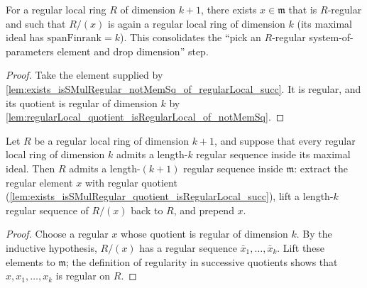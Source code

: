 \begin{lemma}\leanok
  \label{lem:exists_isSMulRegular_quotient_isRegularLocal_succ}
  For a regular local ring \(R\) of dimension \(k + 1\), there exists \(x \in \mathfrak m\)
  that is \(R\)-regular and such that \(R / (x)\) is again a regular local ring of
  dimension \(k\) (its maximal ideal has \(\text{spanFinrank} = k\)). This consolidates the
  ``pick an \(R\)-regular system-of-parameters element and drop dimension'' step.
\end{lemma}
\begin{proof}

\leanok
  Take the element supplied by
  \cref{lem:exists_isSMulRegular_notMemSq_of_regularLocal_succ}.
  It is regular, and its quotient is regular of dimension \(k\) by
  \cref{lem:regularLocal_quotient_isRegularLocal_of_notMemSq}.
\end{proof}

\begin{lemma}\leanok
  \label{lem:regularLocal_inductive_step}
  Let \(R\) be a regular local ring of dimension \(k + 1\), and suppose that every regular
  local ring of dimension \(k\) admits a length-\(k\) regular sequence inside its maximal
  ideal. Then \(R\) admits a length-\((k+1)\) regular sequence inside \(\mathfrak m\): extract
  the regular element \(x\) with regular quotient
  (\cref{lem:exists_isSMulRegular_quotient_isRegularLocal_succ}), lift a length-\(k\)
  regular sequence of \(R/(x)\) back to \(R\), and prepend \(x\).
\end{lemma}
\begin{proof}

\leanok
  Choose a regular \(x\) whose quotient is regular of dimension
  \(k\). By the inductive hypothesis, \(R/(x)\) has a regular sequence
  \(\bar x_1,\ldots,\bar x_k\). Lift these elements to \(\mathfrak m\);
  the definition of regularity in successive quotients shows that
  \(x,x_1,\ldots,x_k\) is regular on \(R\).
\end{proof}

